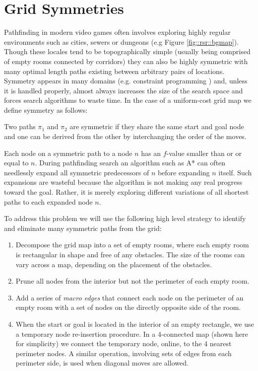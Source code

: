 \section{Grid Symmetries}
Pathfinding in modern video games often involves exploring highly regular
environments such as cities, sewers or dungeons (e.g Figure
\ref{fig::rsr::bgmap}).  Though these locales tend to be topographically simple
(usually being comprised of empty rooms connected by corridors) they can also be
highly symmetric with many optimal length paths existing between arbitrary pairs
of locations.  Symmetry appears in many domains (e.g. constraint programming
\cite{walsh07}) and, unless it is handled properly, almost always increases the
size of the search space and forces search algorithms to waste time. In the case
of a uniform-cost grid map we define symmetry as follows:

\begin{definition}
\label{def::rsr::symmetry}
Two paths $\pi_{1}$ and $\pi_{2}$ are symmetric if they share the same start and
goal node and one can be derived from the other by interchanging the order of the
moves.
\end{definition}

Each node on a symmetric path to a node $n$ has an $f$-value smaller than or
or equal to $n$. During pathfinding search an algorithm such as A* can
often needlessly expand all symmetric predecessors of $n$ before expanding $n$ itself.
Such expansions are wasteful because the algorithm is not making any real progress
toward the goal. Rather, it is merely exploring different variations of all shortest 
paths to each expanded node $n$.

To address this problem we will use the following high level 
strategy to identify and eliminate many symmetric paths from the grid:

\begin{enumerate}
\item{Decompose the grid map into a set of empty rooms, where each empty room is
rectangular in shape and free of any obstacles.  The size of the rooms can vary
across a map, depending on the placement of the obstacles.}
\item{Prune all nodes from the interior but not the perimeter of each empty
room.}
\item{Add a series of \emph{macro edges} that connect each node on the perimeter
of an empty room with a set of nodes on the directly opposite side of the room.}
\item{When the start or goal is located in the interior of an empty rectangle, we use
a temporary node re-insertion procedure.  In a 4-connected map (shown here for
simplicity) we connect the temporary node, online, to the 4 nearest perimeter
nodes. A similar operation, involving sets of edges from each perimeter side, is
used when diagonal moves are allowed.}
\end{enumerate}

